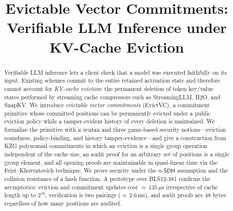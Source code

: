 \documentclass[version=preprint]{iacrcc}
\title[running = {Evictable Vector Commitments}]{Evictable Vector Commitments: Verifiable LLM Inference under KV-Cache Eviction}
\theoremstyle{definition}
\newcommand{\nsdh}{n\text{-}\mathsf{SDH}}
\begin{document}
\maketitle


\begin{abstract}
Verifiable LLM inference lets a client check that a model was executed
faithfully on its input. Existing schemes commit to the entire retained
activation state and therefore cannot account for \emph{KV-cache eviction}:
the permanent deletion of token key/value states performed by streaming cache
compressors such as StreamingLLM, H2O, and SnapKV. We introduce
\emph{evictable vector commitments} (EvictVC), a commitment primitive whose
committed positions can be permanently evicted under a public eviction policy
while a tamper-evident history of every deletion is maintained. We formalize
the primitive with a syntax and three game-based security notions---eviction
soundness, policy-binding, and history tamper-evidence---and give a
construction from KZG polynomial commitments in which an eviction is a single
group operation independent of the cache size, an audit proof for an arbitrary
set of positions is a single group element, and all opening proofs are
maintainable in quasi-linear time via the Feist--Khovratovich technique. We
prove security under the $\nsdh$ assumption and the collision resistance of a
hash function. A prototype over BLS12-381 confirms the asymptotics: eviction and
commitment updates cost ${\approx}\,135\,\mu\mathrm{s}$ irrespective of cache
length up to $2^{16}$, verification is two pairings
(${\approx}\,2.6\,\mathrm{ms}$), and audit proofs are $48$ bytes regardless of
how many positions are audited.
\end{abstract}
\end{document}
